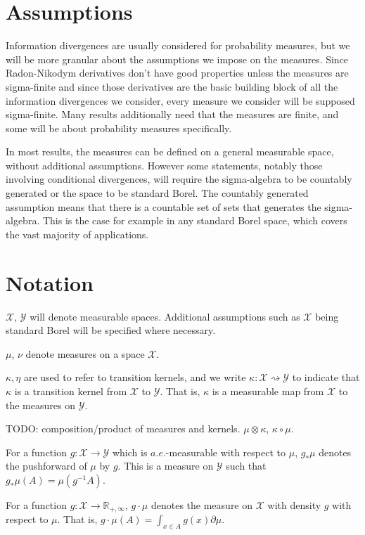 \section*{Assumptions}

Information divergences are usually considered for probability measures, but we will be more granular about the assumptions we impose on the measures.
Since Radon-Nikodym derivatives don't have good properties unless the measures are sigma-finite and since those derivatives are the basic building block of all the information divergences we consider, every measure we consider will be supposed sigma-finite.
Many results additionally need that the measures are finite, and some will be about probability measures specifically.

In most results, the measures can be defined on a general measurable space, without additional assumptions.
However some statements, notably those involving conditional divergences, will require the sigma-algebra to be countably generated or the space to be standard Borel.
The countably generated assumption means that there is a countable set of sets that generates the sigma-algebra.
This is the case for example in any standard Borel space, which covers the vast majority of applications.

\section*{Notation}

$\mathcal X$, $\mathcal Y$ will denote measurable spaces. Additional assumptions such as $\mathcal X$ being standard Borel will be specified where necessary.

$\mu$, $\nu$ denote measures on a space $\mathcal X$.

$\kappa, \eta$ are used to refer to transition kernels, and we write $\kappa : \mathcal X \rightsquigarrow \mathcal Y$ to indicate that $\kappa$ is a transition kernel from $\mathcal X$ to $\mathcal Y$. That is, $\kappa$ is a measurable map from $\mathcal X$ to the measures on $\mathcal Y$.

TODO: composition/product of measures and kernels. $\mu \otimes \kappa$, $\kappa \circ \mu$.

For a function $g : \mathcal X \to \mathcal Y$ which is $a.e.$-measurable with respect to $\mu$, $g_* \mu$ denotes the pushforward of $\mu$ by $g$. This is a measure on $\mathcal Y$ such that $g_* \mu (A) = \mu(g^{-1} A)$.

For a function $g : \mathcal X \to \mathbb{R}_{+,\infty}$, $g \cdot \mu$ denotes the measure on $\mathcal X$ with density $g$ with respect to $\mu$. That is, $g \cdot \mu (A) = \int_{x \in A} g(x) \partial\mu$.
